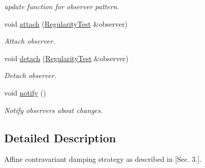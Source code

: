 \begin{DoxyCompactItemize}
\begin{DoxyCompactList}\small\item\em update function for observer pattern. \end{DoxyCompactList}\item 
\hypertarget{classSpacy_1_1Mixin_1_1MixinConnection_abb5520ee6b22dd993d78f142939a1ed4}{void \hyperlink{classSpacy_1_1Mixin_1_1MixinConnection_abb5520ee6b22dd993d78f142939a1ed4}{attach} (\hyperlink{classSpacy_1_1Mixin_1_1RegularityTest_a548d9d45c31c7833266bd3b20dc1aa7e}{Regularity\-Test} \&observer)}\label{classSpacy_1_1Mixin_1_1MixinConnection_abb5520ee6b22dd993d78f142939a1ed4}

\begin{DoxyCompactList}\small\item\em Attach observer. \end{DoxyCompactList}\item 
\hypertarget{classSpacy_1_1Mixin_1_1MixinConnection_adda739590c487679c26f60e50aedb73f}{void \hyperlink{classSpacy_1_1Mixin_1_1MixinConnection_adda739590c487679c26f60e50aedb73f}{detach} (\hyperlink{classSpacy_1_1Mixin_1_1RegularityTest_a548d9d45c31c7833266bd3b20dc1aa7e}{Regularity\-Test} \&observer)}\label{classSpacy_1_1Mixin_1_1MixinConnection_adda739590c487679c26f60e50aedb73f}

\begin{DoxyCompactList}\small\item\em Detach observer. \end{DoxyCompactList}\item 
\hypertarget{classSpacy_1_1Mixin_1_1MixinConnection_a1ddeaa78a3bb4a38c2cca36d1f99fe36}{void \hyperlink{classSpacy_1_1Mixin_1_1MixinConnection_a1ddeaa78a3bb4a38c2cca36d1f99fe36}{notify} ()}\label{classSpacy_1_1Mixin_1_1MixinConnection_a1ddeaa78a3bb4a38c2cca36d1f99fe36}

\begin{DoxyCompactList}\small\item\em Notify observers about changes. \end{DoxyCompactList}\end{DoxyCompactItemize}


\subsection{Detailed Description}
Affine contravariant damping strategy as described in \cite{Deuflhard2004} \mbox{[}Sec. 3.\mbox{]}. 

